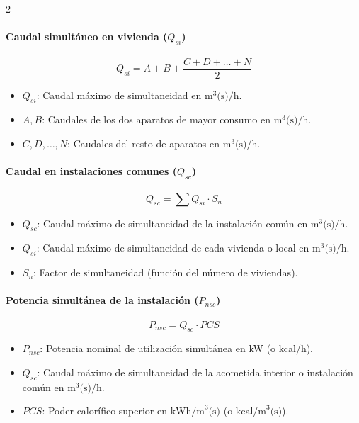 \documentclass[11pt]{article}
\begin{document}
\begin{multicols*}{2}
    \paragraph*{Caudal simultáneo en vivienda ($Q_{si}$)}
    \begin{equation}
        Q_{si} = A + B + \frac{C + D + \dots + N}{2}
    \end{equation}
    \begin{itemize}
        \item $Q_{si}$: Caudal máximo de simultaneidad en $\text{m}^3\text{(s)/h}$.
        \item $A, B$: Caudales de los dos aparatos de mayor consumo en $\text{m}^3\text{(s)/h}$.
        \item $C, D, \dots, N$: Caudales del resto de aparatos en $\text{m}^3\text{(s)/h}$.
    \end{itemize}

    \paragraph*{Caudal en instalaciones comunes ($Q_{sc}$)}
    \begin{equation}
        Q_{sc} = \sum Q_{si} \cdot S_n
    \end{equation}
    \begin{itemize}
        \item $Q_{sc}$: Caudal máximo de simultaneidad de la instalación común en $\text{m}^3\text{(s)/h}$.
        \item $Q_{si}$: Caudal máximo de simultaneidad de cada vivienda o local en $\text{m}^3\text{(s)/h}$.
        \item $S_n$: Factor de simultaneidad (función del número de viviendas).
    \end{itemize}

    \paragraph*{Potencia simultánea de la instalación ($P_{nsc}$)}
    \begin{equation}
        P_{nsc} = Q_{sc} \cdot PCS
    \end{equation}
    \begin{itemize}
        \item $P_{nsc}$: Potencia nominal de utilización simultánea en kW (o kcal/h).
        \item $Q_{sc}$: Caudal máximo de simultaneidad de la acometida interior o instalación común en $\text{m}^3\text{(s)/h}$.
        \item $PCS$: Poder calorífico superior en $\text{kWh/m}^3\text{(s)}$ (o $\text{kcal/m}^3\text{(s)}$).
    \end{itemize}


\end{multicols*}
\end{document}
